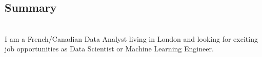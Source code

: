 \begin{adjustwidth}{42pt}{50pt}
\section{Summary}
\\
I am a French/Canadian Data Analyst living in London and looking for exciting job opportunities as Data Scientist or Machine Learning Engineer.
\end{adjustwidth}